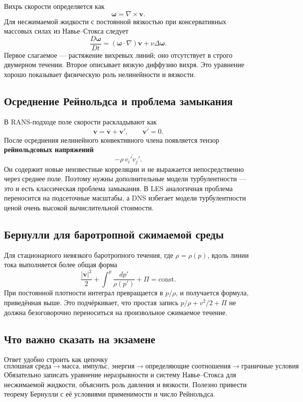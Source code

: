 Вихрь скорости определяется как
\[
    \boldsymbol\omega=\nabla\times\mathbf v.
\]
Для несжимаемой жидкости с постоянной вязкостью при консервативных массовых силах
из Навье--Стокса следует
\[
    \boxed{
    \frac{D\boldsymbol\omega}{Dt}
    =(\boldsymbol\omega\cdot\nabla)\mathbf v
    +\nu\Delta\boldsymbol\omega.
    }
\]
Первое слагаемое --- растяжение вихревых линий; оно отсутствует в строго
двумерном течении. Второе описывает вязкую диффузию вихря. Это уравнение хорошо
показывает физическую роль нелинейности и вязкости.

\subsection{Осреднение Рейнольдса и проблема замыкания}

В RANS-подходе поле скорости раскладывают как
\[
    \mathbf v=\overline{\mathbf v}+\mathbf v',
    \qquad \overline{\mathbf v'}=0.
\]
После осреднения нелинейного конвективного члена появляется тензор
\textbf{рейнольдсовых напряжений}
\[
    -\rho\,\overline{v_i'v_j'}.
\]
Он содержит новые неизвестные корреляции и не выражается непосредственно через
среднее поле. Поэтому нужны дополнительные модели турбулентности --- это и есть
классическая проблема замыкания. В LES аналогичная проблема переносится на
подсеточные масштабы, а DNS избегает модели турбулентности ценой очень высокой
вычислительной стоимости.

\subsection{Бернулли для баротропной сжимаемой среды}

Для стационарного невязкого баротропного течения, где $\rho=\rho(p)$, вдоль
линии тока выполняется более общая форма
\[
    \boxed{
    \frac{|\mathbf v|^2}{2}
    +\int^p\frac{dp'}{\rho(p')}
    +\Pi=\text{const}.
    }
\]
При постоянной плотности интеграл превращается в $p/\rho$, и получается формула,
приведённая выше. Это подчёркивает, что простая запись $p/\rho+v^2/2+\Pi$ не
должна безоговорочно переноситься на произвольное сжимаемое течение.

\subsection{Что важно сказать на экзамене}

Ответ удобно строить как цепочку
\[
\boxed{
\text{сплошная среда}
\to
\text{масса, импульс, энергия}
\to
\text{определяющие соотношения}
\to
\text{граничные условия}
}.
\]
Обязательно записать уравнение неразрывности и систему Навье--Стокса для
несжимаемой жидкости, объяснить роль давления и вязкости. Полезно привести
теорему Бернулли с её условиями применимости и число Рейнольдса.

\newpage
